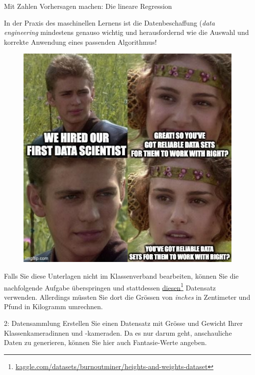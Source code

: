 \begin{lpu}{Mit Zahlen Vorhersagen machen: Die lineare Regression}
\begin{hinweis}
In der Praxis des maschinellen Lernens ist die Datenbeschaffung (\textit{data engineering} mindestens genauso wichtig und herausfordernd wie die Auswahl und korrekte Anwendung eines passenden Algorithmus!
\begin{figure}[H]
  \centering
  \includegraphics[scale=0.25]{lpu/data.jpeg}
  \label{fig:data}
\end{figure}

\end{hinweis}

Falls Sie diese Unterlagen nicht im Klassenverband bearbeiten, können Sie die nachfolgende Aufgabe überspringen und stattdessen \href{https://www.kaggle.com/datasets/burnoutminer/heights-and-weights-dataset}{diesen}\footnote{\href{https://www.kaggle.com/datasets/burnoutminer/heights-and-weights-dataset}{\url{kaggle.com/datasets/burnoutminer/heights-and-weights-dataset}}} Datensatz verwenden. Allerdings müssten Sie dort die Grössen von \textit{inches} in Zentimeter und Pfund in Kilogramm umrechnen.

\begin{aufgabe}{2: Datensammlung}
Erstellen Sie einen Datensatz mit Grösse und Gewicht Ihrer Klassenkameradinnen und -kameraden. Da es nur darum geht, anschauliche Daten zu generieren, können Sie hier auch Fantasie-Werte angeben.


\end{aufgabe}
\end{lpu}
